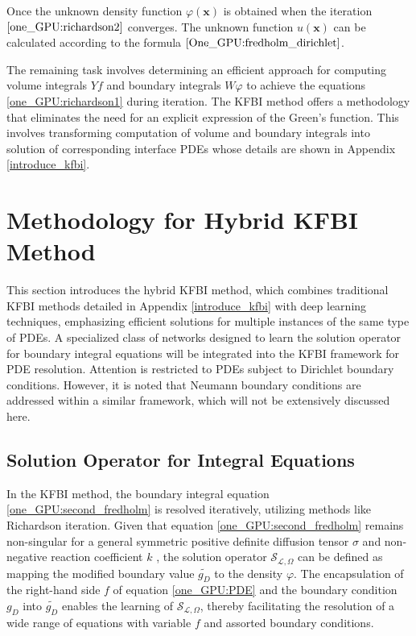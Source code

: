 \documentclass{article}
\begin{document}
Once the unknown density function $\varphi(\mathbf{x})$ is obtained when the iteration $\eqref{one_GPU:richardson2}$ converges. The unknown function $u(\mathbf{x})$ can be calculated according to the formula $\eqref{One_GPU:fredholm_dirichlet}$.

The remaining task involves determining an efficient approach for computing volume integrals $Yf$ and boundary integrals $W \varphi$ to achieve the equations \eqref{one_GPU:richardson1} during iteration. The KFBI method offers a methodology that eliminates the need for an explicit expression of the Green's function. This involves transforming  computation of volume and boundary integrals into  solution of corresponding interface PDEs whose details are shown in Appendix \ref{introduce_kfbi}. 


\section{Methodology for Hybrid KFBI Method}
\label{Hybrid}
This section introduces the hybrid KFBI method, which combines traditional KFBI methods detailed in Appendix \ref{introduce_kfbi} with deep learning techniques, emphasizing efficient solutions for multiple instances of the same type of PDEs. A specialized class of networks designed to learn the solution operator for boundary integral equations will be integrated into the KFBI framework for PDE resolution. Attention is restricted to PDEs subject to Dirichlet boundary conditions. However, it is noted that Neumann boundary conditions are addressed within a similar framework, which will not be extensively discussed here.

\subsection{Solution Operator for Integral Equations}
In the KFBI method, the boundary integral equation \eqref{one_GPU:second_fredholm} is resolved iteratively, utilizing methods like Richardson iteration. Given that equation \eqref{one_GPU:second_fredholm} remains non-singular for a general symmetric positive definite diffusion tensor $\sigma$ and non-negative reaction coefficient $k$ \cite{ying2007kernel}, the solution operator $\mathcal{S}_{\mathcal{L}, \Omega}$ can be defined as mapping the modified boundary value $\widetilde{g_D}$ to the density $\varphi$. The encapsulation of the right-hand side \(f\) of equation \eqref{one_GPU:PDE} and the boundary condition $g_D$ into $\widetilde{g_D}$ enables the learning of $\mathcal{S}_{\mathcal{L}, \Omega}$, thereby facilitating the resolution of a wide range of equations with variable \(f\) and assorted boundary conditions.
\end{document}
